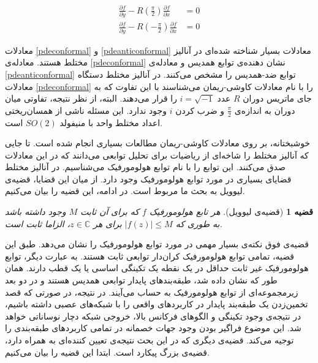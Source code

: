 \documentclass[12pt,onecolumn,a4paper]{article}
\newtheorem{theorem}{قضیه}[section]
\begin{document}
\begin{align}
    \frac{\partial f}{\partial y} - R(\frac{\pi}{2})\frac{\partial f}{\partial x}&=0\label{pdeconformal}\\
    \frac{\partial f}{\partial y} - R(-\frac{\pi}{2})\frac{\partial f}{\partial x}&=0\label{pdeanticonformal}
\end{align}

معادلات \ref{pdeconformal} و \ref{pdeanticonformal} 
معادلات بسیار شناخته شده‌ای در آنالیز مختلط هستند. معادله‌ی \ref{pdeconformal} 
نشان دهنده‌ی توابع همدیس
و معادله‌ی \ref{pdeanticonformal} 
توابع ضد-همدیس را مشخص می‌کنند. در آنالیز مختلط دستگاه معادلات \ref{pdeconformal} 
را با نام معادلات کاوشی-ریمان می‌شناسند با این تفاوت که به جای ماتریس دوران $R$ عدد $i=\sqrt{-1}$ 
را قرار می‌دهند. البته، از نظر نتیجه، تفاوتی میان دوران به اندازه‌ی $\frac{\pi}{2}$ 
و ضرب کردن $i$ 
وجود ندارد. این مسئله ناشی از همسان‌ریختی 
اعداد مختلط واحد با منیفولد $SO(2)$ 
است.

خوشبختانه، بر روی معادلات کاوشی-ریمان مطالعات بسیاری انجام شده است. تا جایی که آنالیز مختلط را شاخه‌ای از ریاضیات برای تحلیل توابعی می‌دانند که در این معادلات صدق می‌کنند. این توابع را با نام توابع هولومورفیک 
می‌شناسیم. در آنالیز مختلط قضایای بسیاری در مورد توابع هولومورفیک وجود دارد. از میان این قضایا، قضیه‌ی لیوویل 
به بحث ما مربوط است. در ادامه، این قضیه را بیان می‌کنیم.

\begin{theorem}[قضیه‌ی لیوویل]
    هر تابع هولومورفیک $f$ 
    که برای آن ثابت $M$ 
    وجود داشته باشد به طوری که $|f(z)|\leq M$ 
    برای هر $z\in \mathbb{C}$، 
    الزاما ثابت است.
\end{theorem}

قضیه‌ی فوق نکته‌ی بسیار مهمی در مورد توابع هولومورفیک را نشان می‌دهد. طبق این قضیه، تمامی توابع هولومورفیک کران‌دار توابعی ثابت هستند. به عبارت دیگر، توابع هولومورفیک غیر ثابت حداقل در یک نقطه یک تکینگی اساسی یا یک قطب دارند. همان طور که نشان داده شد، طبقه‌بندهای پایدار توابعی همدیس هستند و در دو بعد زیرمجموعه‌ای از توابع هولومورفیک به حساب می‌آیند. در نتیجه، در صورتی که قصد تخمین‌زدن یک طبقه‌بند پایدار در کاربردهای واقعی را با شبکه‌های عصبی داشته باشیم، در نتیجه‌ی وجود تکینگی و الگوهای فرکانس بالا، خروجی شبکه دچار نوساناتی خواهد شد. این موضوع فراگیر بودن وجود جهات خصمانه در تمامی کاربردهای طبقه‌بندی را توجیه می‌کند. قضیه‌ی دیگری که در این بحث نتیجه‌ی تعیین کننده‌ای به همراه دارد، قضیه‌ی بزرگ پیکارد 
است. ابتدا این قضیه را بیان می‌کنیم.
\end{document}
